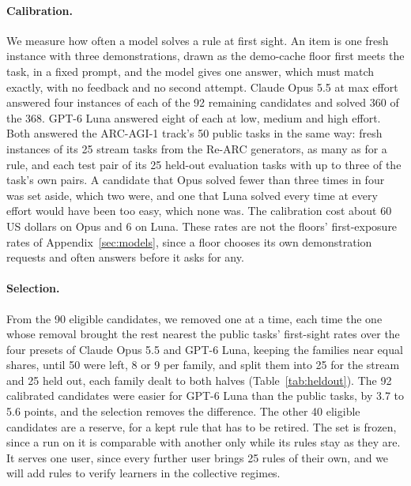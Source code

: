 \paragraph{Calibration.} We measure how often a model solves a rule at first sight. An item is one fresh instance with three demonstrations, drawn as the demo-cache floor first meets the task, in a fixed prompt, and the model gives one answer, which must match exactly, with no feedback and no second attempt. Claude Opus 5.5 at max effort answered four instances of each of the 92 remaining candidates and solved 360 of the 368. GPT-6 Luna answered eight of each at low, medium and high effort. Both answered the ARC-AGI-1 track's 50 public tasks in the same way: fresh instances of its 25 stream tasks from the Re-ARC generators, as many as for a rule, and each test pair of its 25 held-out evaluation tasks with up to three of the task's own pairs. A candidate that Opus solved fewer than three times in four was set aside, which two were, and one that Luna solved every time at every effort would have been too easy, which none was. The calibration cost about 60 US dollars on Opus and 6 on Luna. These rates are not the floors' first-exposure rates of Appendix~\ref{sec:models}, since a floor chooses its own demonstration requests and often answers before it asks for any.

\paragraph{Selection.} From the 90 eligible candidates, we removed one at a time, each time the one whose removal brought the rest nearest the public tasks' first-sight rates over the four presets of Claude Opus 5.5 and GPT-6 Luna, keeping the families near equal shares, until 50 were left, 8 or 9 per family, and split them into 25 for the stream and 25 held out, each family dealt to both halves (Table~\ref{tab:heldout}). The 92 calibrated candidates were easier for GPT-6 Luna than the public tasks, by 3.7 to 5.6 points, and the selection removes the difference. The other 40 eligible candidates are a reserve, for a kept rule that has to be retired. The set is frozen, since a run on it is comparable with another only while its rules stay as they are. It serves one user, since every further user brings 25 rules of their own, and we will add rules to verify learners in the collective regimes.

